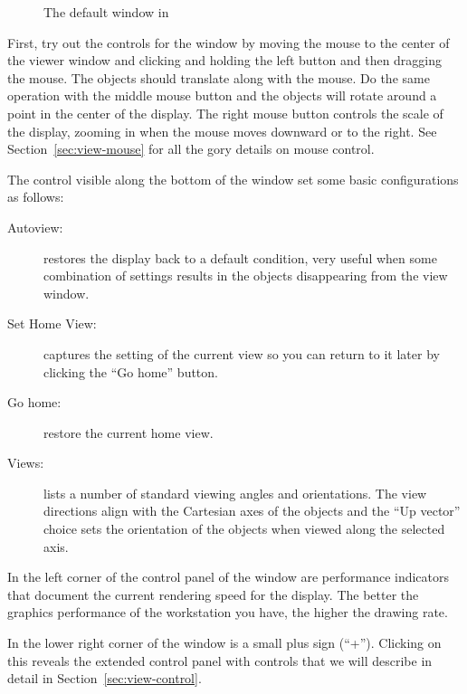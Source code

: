 \begin{figure}[htb]
  \begin{makeimage}
  \end{makeimage}
  \caption{\label{fig:viewwindow} The default \viewer{} window in \SR{}}
\end{figure}


First, try out the controls for the \graphics{} window by moving the mouse
to the center of the viewer window and clicking and holding the left button
and then dragging the mouse.  The objects should translate along with the
mouse.  Do the same operation with the middle mouse button and the objects
will rotate around a point in the center of the display.  The right mouse
button controls the scale of the display, zooming in  when the mouse moves
downward or to the right.  See Section~\ref{sec:view-mouse} for all the
gory details on mouse control.

The control visible along the bottom of the \viewer{} window set some basic
configurations as follows:
%
\begin{description}
  \item [Autoview: ] restores the display back to a default condition, very
        useful when some combination of settings results in the objects
        disappearing from the view window.
  \item [Set Home View: ] captures the setting of the current view so you
        can return to it later by clicking the ``Go home'' button.
  \item [Go home: ] restore the current home view.
  \item [Views: ] lists a number of standard viewing angles and
        orientations.  The view directions align with the Cartesian axes
        of the objects and the ``Up vector'' choice sets the orientation of
        the objects when viewed along the selected axis.
\end{description}

In the left corner of the control panel of the \viewer{} window are
performance indicators that document the current rendering speed for the
display.  The better the graphics performance of the workstation you
have, the higher the drawing rate.

In the lower right corner of the \viewer{} window is a small plus sign
(``+'').  Clicking on this reveals the extended control panel with controls
that we will describe in detail in Section~\ref{sec:view-control}.



